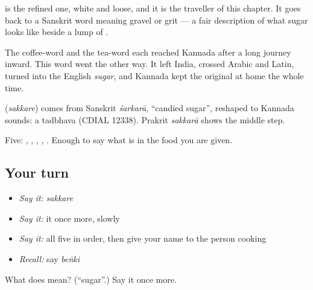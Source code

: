  is the refined one, white and loose, and it is the traveller of this chapter. It goes back to a Sanskrit word meaning gravel or grit — a fair description of what sugar looks like beside a lump of .

The coffee-word and the tea-word each reached Kannada after a long journey inward. This word went the other way. It left India, crossed Arabic and Latin, turned into the English \emph{sugar}, and Kannada kept the original at home the whole time.

\begin{cousinweb}
\textbf{} (\emph{sakkare}) comes from Sanskrit \emph{śarkarā}, \textquotedblleft{}candied sugar\textquotedblright{}, reshaped to Kannada sounds: a tadbhava (CDIAL 12338). Prakrit \emph{sakkarā} shows the middle step.
\end{cousinweb}

\begin{grammarlens}[title={What you've built}]
Five: , , , , . Enough to say what is in the food you are given.
\end{grammarlens}

\subsection*{Your turn}
\begin{itemize}
\raggedright
  \item \emph{Say it:} \emph{sakkare}
  \item \emph{Say it:} it once more, slowly
  \item \emph{Say it:} all five in order, then give your name to the person cooking
  \item \emph{Recall:} say \emph{beṅki}
\end{itemize}

\begin{tcolorbox}[breakable,colback=teal!4,colframe=teal!35!black,title={Before you move on}]
What does  mean? (\textquotedblleft{}sugar\textquotedblright{}.) Say it once more.
\end{tcolorbox}
